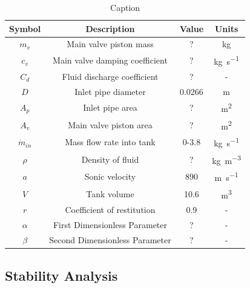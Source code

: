\begin{table}[ht]
    \centering
    \begin{tabular}{c|c|c|c}
        Symbol & Description & Value & Units \\ \hline \hline
        $m_v$ & Main valve piston mass & ? & \si{kg} \\ \hline %
        $c_v$ & Main valve damping coefficient & ? & \si{kg.s^{-1}} \\ \hline %
        $C_d$ & Fluid discharge coefficient & ? & - \\ \hline %
        $D$ & Inlet pipe diameter & 0.0266 & \si{m} \\ \hline %
        $A_p$ & Inlet pipe area & ? & \si{m^2} \\ \hline
        $A_v$ & Main valve piston area & ? & \si{m^2} \\ \hline
        $\dot{m}_{in}$ & Mass flow rate into tank & 0-3.8 & \si{kg.s^{-1}} \\ \hline %
        $\rho$ & Density of fluid & ? & \si{kg.m^{-3}} \\ \hline %
        $a$ & Sonic velocity & 890 & \si{m.s^{-1}} \\ \hline %
        $V$ & Tank volume & 10.6 & \si{m^3} \\ \hline %
        $r$ & Coefficient of restitution & 0.9 & - \\ \hline \hline %
        $\alpha$ & First Dimensionless Parameter & ? & - \\ \hline
        $\beta$ & Second Dimensionless Parameter & ? & - \\
    \end{tabular}
    \caption{Caption}
    \label{tab:my_label}
\end{table}

\subsection{Stability Analysis}



